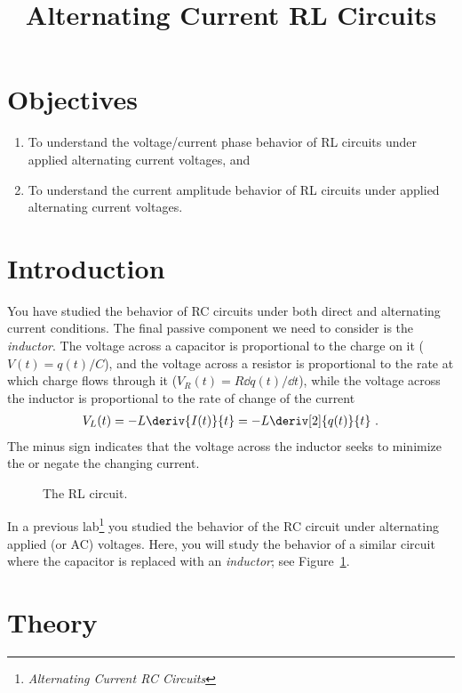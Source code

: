 \documentclass[12pt]{article}
\title{Alternating Current RL Circuits}
\author{}
\date{}
\begin{document}
\maketitle

\section{Objectives}
\label{sec:objectives}

\begin{enumerate}
\item To understand the voltage/current phase behavior of RL circuits
  under applied alternating current voltages, and
\item To understand the current amplitude behavior of RL circuits
  under applied alternating current voltages.
\end{enumerate}

\section{Introduction}
\label{sec:introduction}

You have studied the behavior of RC circuits under both direct and
alternating current conditions.  The final passive component we need
to consider is the \textit{inductor}.  The voltage across a capacitor
is proportional to the charge on it ($V(t) = q(t)/C$), and the voltage
across a resistor is proportional to the rate at which charge flows
through it ($V_R(t) = R \dd q(t)/\dd t$), while the voltage across the
inductor is proportional to the rate of change of the current
\begin{gather*}
  V_L(t) = - L \deriv{I(t)}{t} = -L \deriv[2]{q(t)}{t}\ .
\end{gather*}
The minus sign indicates that the voltage across the inductor seeks to
minimize the or negate the changing current.

\begin{figure}
  \centering
  \caption{The RL circuit.}
  \label{fig:rlcircuit}
\end{figure}
In a previous lab\footnote{\textit{Alternating Current RC Circuits}}
you studied the behavior of the RC circuit under alternating applied
(or AC) voltages.  Here, you will study the behavior of a similar
circuit where the capacitor is replaced with an \textit{inductor}; see
Figure~\ref{fig:rlcircuit}. 

\section{Theory}
\label{sec:theory}
\end{document}
